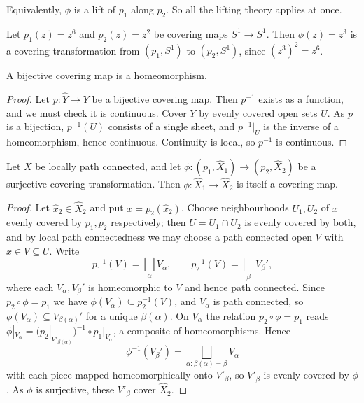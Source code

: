 Equivalently, $\phi$ is a lift of $p_1$ along $p_2$. So all the lifting theory applies at
once.

\begin{example}
	Let $p_1(z) = z^6$ and $p_2(z) = z^2$ be covering maps $S^1 \to S^1$. Then $\phi(z) = z^3$ is a covering transformation from $(p_1, S^1)$ to $(p_2, S^1)$, since $(z^3)^2 = z^6$.
\end{example}

\begin{lemma} \label{lem:bijective-cover}
	A bijective covering map is a homeomorphism.
\end{lemma}
\begin{proof}
	Let $p: \hat Y \to Y$ be a bijective covering map. Then $p^{-1}$ exists as a function, and we must check it is continuous. Cover $Y$ by evenly covered open sets $U$. As $p$ is a bijection, $p^{-1}(U)$ consists of a single sheet, and $p^{-1}|_U$ is the inverse of a homeomorphism, hence continuous. Continuity is local, so $p^{-1}$ is continuous.
\end{proof}

\begin{lemma} \label{lem:ct-is-cover}
	Let $X$ be locally path connected, and let $\phi: (p_1, \hat X_1) \to (p_2, \hat X_2)$ be a surjective covering transformation. Then $\phi: \hat X_1 \to \hat X_2$ is itself a covering map.
\end{lemma}
\begin{proof}
	Let $\hat x_2 \in \hat X_2$ and put $x = p_2(\hat x_2)$. Choose neighbourhoods $U_1, U_2$ of $x$ evenly covered by $p_1, p_2$ respectively; then $U = U_1 \cap U_2$ is evenly covered by both, and by local path connectedness we may choose a path connected open $V$ with $x \in V \subseteq U$. Write
	$$
	p_1^{-1}(V) = \bigsqcup_{\alpha} V_\alpha, \qquad p_2^{-1}(V) = \bigsqcup_\beta V_\beta',
	$$
	where each $V_\alpha, V_\beta'$ is homeomorphic to $V$ and hence path connected. Since $p_2 \circ \phi = p_1$ we have $\phi(V_\alpha) \subseteq p_2^{-1}(V)$, and $V_\alpha$ is path connected, so $\phi(V_\alpha) \subseteq V_{\beta(\alpha)}'$ for a unique $\beta(\alpha)$. On $V_\alpha$ the relation $p_2 \circ \phi = p_1$ reads $\phi|_{V_\alpha} = (p_2|_{V'_{\beta(\alpha)}})^{-1} \circ p_1|_{V_\alpha}$, a composite of homeomorphisms. Hence
	$$
	\phi^{-1}(V_\beta') = \bigsqcup_{\alpha : \beta(\alpha) = \beta} V_\alpha
	$$
	with each piece mapped homeomorphically onto $V'_\beta$, so $V'_\beta$ is evenly covered by $\phi$. As $\phi$ is surjective, these $V'_\beta$ cover $\hat X_2$.
\end{proof}

